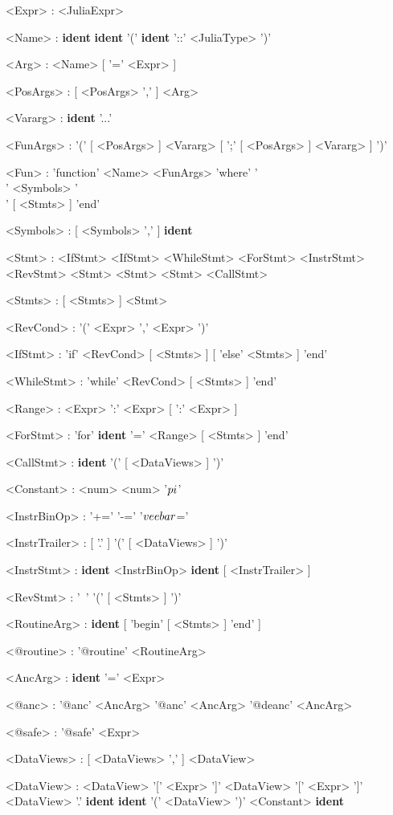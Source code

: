 \begin{grammar}
    <Expr> : <JuliaExpr>

    <Name> : \textbf{ident}
    \alt \textbf{ident}
    \alt '(' \textbf{ident} '::' <JuliaType> ')'

    <Arg> : <Name> [ '=' <Expr> ]

    <PosArgs> : [ <PosArgs> ',' ] <Arg>

    <Vararg> : \textbf{ident} '...'

    <FunArgs> : '(' [ <PosArgs> ] <Vararg> [ ';' [ <PosArgs> ] <Vararg> ] ')'

    <Fun> : 'function' <Name> <FunArgs> 'where' '\\{' <Symbols> '\\}' [ <Stmts> ] 'end'

    <Symbols> : [ <Symbols> ',' ] \textbf{ident}

    <Stmt> : <IfStmt>
    \alt <IfStmt>
    \alt <WhileStmt>
    \alt <ForStmt>
    \alt <InstrStmt>
    \alt <RevStmt>
     <Stmt>
     <Stmt>
     <Stmt>
    \alt <CallStmt>

    <Stmts> : [ <Stmts> ] <Stmt>

    <RevCond> : '(' <Expr> ',' <Expr> ')'

    <IfStmt> : 'if' <RevCond> [ <Stmts> ] [ 'else' <Stmts> ] 'end'

    <WhileStmt> : 'while' <RevCond> [ <Stmts> ] 'end'

    <Range> : <Expr> ':' <Expr> [ ':' <Expr> ]

    <ForStmt> : 'for' \textbf{ident} '=' <Range> [ <Stmts> ] 'end'

    <CallStmt> : \textbf{ident} '(' [ <DataViews> ] ')'

    <Constant> : <num>
    \alt <num>
    \alt '$\\pi$'

    <InstrBinOp> : '+=' \alt '-=' \alt '$\\veebar$='

    <InstrTrailer> : [ '.' ] '(' [ <DataViews> ] ')'

    <InstrStmt> : \textbf{ident} <InstrBinOp> \textbf{ident} [ <InstrTrailer> ]

    <RevStmt> : '~' '(' [ <Stmts> ] ')'

    <RoutineArg> : \textbf{ident} [ 'begin' [ <Stmts> ] 'end' ]

    <@routine> : '@routine' <RoutineArg>

    <AncArg> : \textbf{ident} '=' <Expr>

    <@anc> : '@anc' <AncArg>
    \alt '@anc' <AncArg>
    \alt '@deanc' <AncArg>

    <@safe> : '@safe' <Expr>

    <DataViews> : [ <DataViews> ',' ] <DataView>

    <DataView> : <DataView> '[' <Expr> ']'
    \alt <DataView> '[' <Expr> ']'
    \alt <DataView> '.' \textbf{ident}
    \alt \textbf{ident} '(' <DataView> ')'
    \alt <Constant>
    \alt \textbf{ident}

\end{grammar}
